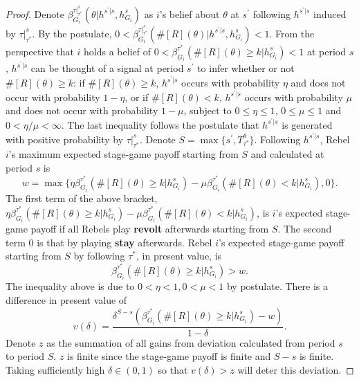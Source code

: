 \documentclass[12pt,letter]{article}
\theoremstyle{definition}
\theoremstyle{remark}
\theoremstyle{claim}
\begin{document}
\begin{proof}
Denote $\beta^{\tau|^s_{\tau^{*}}}_{G_i}(\theta|h^{s^{'}|s}, h^s_{G_i})$ as $i$'s belief about $\theta$ at $s^{'}$ following $h^{s^{'}|s}$ induced by $\tau|^s_{\tau^{*}}$. By the postulate,  $0<\beta^{\tau|^s_{\tau^{*}}}_{G_i}(\#[R](\theta)|h^{s^{'}|s}, h^s_{G_i})<1$. From the perspective that $i$ holds a belief of $0<\beta^{\tau^{*}}_{G_i}(\#[R](\theta)\geq k|h^s_{G_i})<1$ at period $s$, $h^{s^{'}|s}$ can be thought of a signal at period $s^{'}$ to infer whether or not $\#[R](\theta)\geq k$: if $\#[R](\theta)\geq k$, $h^{s^{'}|s}$ occurs with probability $\eta$ and does not occur with probability $1-\eta$, or if $\#[R](\theta)< k$, $h^{s^{'}|s}$ occurs with probability $\mu$ and does not occur with probability $1-\mu$, subject to $0\leq \eta \leq 1$, $0\leq\mu\leq 1$ and $0<\eta/\mu<\infty$. The last inequality follows the postulate that $h^{s^{'}|s}$ is generated with positive probability by $\tau|^s_{\tau^{*}}$. Denote $S=\max\{s^{'}, T^{\theta}_{\tau^{*}}\}$. Following $h^{s^{'}|s}$, Rebel $i$'s maximum expected stage-game payoff starting from $S$ and calculated at period $s$ is 
\[w=\max\{\eta\beta^{\tau^{*}}_{G_i}(\#[R](\theta)\geq k|h^s_{G_i})-\mu\beta^{\tau^{*}}_{G_i}(\#[R](\theta)< k|h^s_{G_i}),0\}.\]
The first term of the above bracket, $\eta\beta^{\tau^{*}}_{G_i}(\#[R](\theta)\geq k|h^s_{G_i})-\mu\beta^{\tau^{*}}_{G_i}(\#[R](\theta)< k|h^s_{G_i})$, is $i$'s expected stage-game payoff if all Rebels play \textbf{revolt} afterwards starting from $S$.  The second term $0$ is that by playing \textbf{stay} afterwards. Rebel $i$'s expected stage-game payoff starting from $S$ by following $\tau^{*}$, in present value, is 
\[\beta^{\tau^{*}}_{G_i}(\#[R](\theta)\geq k|h^s_{G_i})>w.\]
The inequality above is due to $0<\eta<1,0<\mu<1$ by postulate. There is a difference in present value of
\[v(\delta)=\frac{\delta^{S-s}(\beta^{\tau^{*}}_{G_i}(\#[R](\theta)\geq k|h^s_{G_i})-w)}{1-\delta}.\]
Denote $z$ as the summation of all gains from deviation calculated from period $s$ to period $S$. $z$ is finite since the stage-game payoff is finite and $S-s$ is finite. Taking sufficiently high $\delta\in(0,1)$ so that $v(\delta)>z$ will deter this deviation.
\end{proof}
\end{document}
